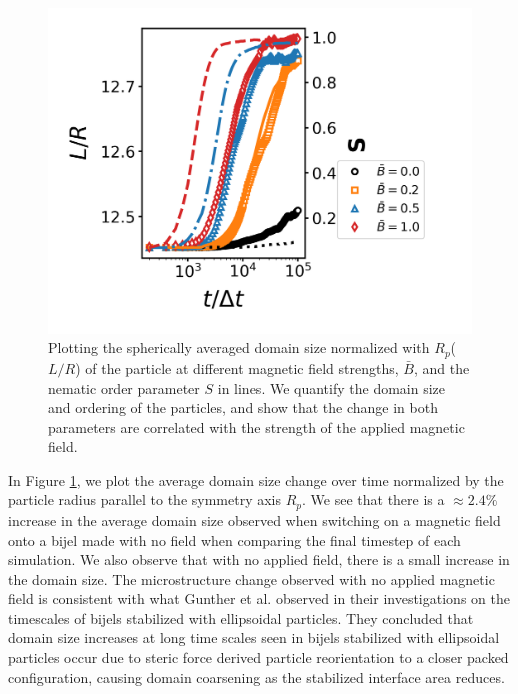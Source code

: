 \begin{figure} 
    \centering 
    \includegraphics[scale=0.7]{../figures/results/paper2/domain_size-field_on.png} 
    \caption{Plotting the spherically averaged domain size normalized with $R_p$($L/R$) of the 
             particle at different magnetic field strengths, $\bar{B}$, and the nematic order parameter $S$ in lines.
             We quantify the domain size and ordering of the particles, and show that the change in both parameters
            are correlated with the strength of the applied magnetic field.} 
    \label{fig:domain_size-field_on} 
    \end{figure}

In Figure \ref{fig:domain_size-field_on}, we plot the average domain size change over time normalized by the particle 
radius parallel to the symmetry axis $R_p$. We see that there is a $\approx 2.4\%$ increase in the average domain size 
observed when switching on a magnetic field onto a bijel made with no field when comparing the final timestep of each 
simulation. We also observe that with no applied field, there is a small increase in the domain size. The 
microstructure change observed with no applied magnetic field is consistent with what Gunther et al. observed 
in their investigations on the timescales of bijels stabilized with ellipsoidal particles. \cite{gunther_timescales_2014} 
They concluded that domain size increases at long time scales seen in bijels stabilized with ellipsoidal particles 
occur due to steric force derived particle reorientation to a closer packed configuration, causing domain coarsening 
as the stabilized interface area reduces.

